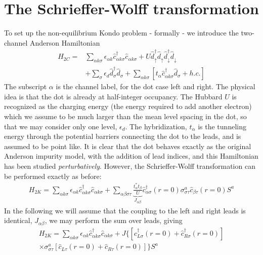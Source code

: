 \documentclass[11pt]{report}
\begin{document}
\section{The Schrieffer-Wolff transformation}
To set up the non-equilibrium Kondo problem - formally - we introduce the two-channel Anderson Hamiltonian
\begin{align}
  H_{2C}=&\sum_{\alpha k\sigma}\epsilon_{\alpha k}\hat{c}^{\dagger}_{\alpha k\sigma}\hat{c}_{\alpha
  k\sigma}+U\hat{d}^{\dagger}_{\uparrow}\hat{d}_{\uparrow}\hat{d}^{\dagger}_{\downarrow}\hat{d}_{\downarrow}\nonumber\\
  &+\sum_{\sigma}\epsilon_{d}\hat{d}^{\dagger}_{\sigma}\hat{d}_{\sigma}+\sum_{\alpha
  k\sigma}[t_{\alpha}\hat{c}^{\dagger}_{\alpha k\sigma}\hat{d}_{\sigma}+h.c.]
\end{align}
The subscript $\alpha$ is the channel label, for the dot case left and right.  The physical idea is that the dot is already at half-integer occupancy.  The Hubbard $U$ is recognized as the charging energy (the energy required to add another electron) which we assume to be much larger than the mean level spacing in the dot, so that we may consider only one level, $\epsilon_{d}$.  The hybridization, $t_{\alpha}$ is the tunneling energy through the potential barriers connecting the dot to the leads, and is assumed to be point like.  It is clear that the dot behaves exactly as the original Anderson impurity model, with the addition of lead indices, and this Hamiltonian has been studied \emph{perturbatively}.  However, the Schrieffer-Wolff transformation can be performed exactly as before:
\begin{align}
  H_{2K}=\sum_{\alpha k\sigma}\epsilon_{\alpha k}\hat{c}^{\dagger}_{\alpha k\sigma}\hat{c}_{\alpha
  k\sigma}+\sum_{\alpha\beta\sigma\tau}\underbrace{\frac{t^{*}_{\alpha}t_{\beta}}{U}}_{J_{\alpha\beta}}\hat{c}^{\dagger}_{\alpha\sigma}(r=0)\sigma^{a}_{\sigma\tau}\hat{c}_{\beta\tau}(r=0)S^{a}
\end{align}
In the following we will assume that the coupling to the left and right leads is identical, $J_{\alpha\beta}$,  we may perform the sum over leads, giving
\begin{align}\label{2lead}
  H_{2K}=\sum_{\alpha k\sigma}\epsilon_{\alpha k}\hat{c}^{\dagger}_{\alpha k\sigma}\hat{c}_{\alpha
  k\sigma}+J\{[\hat{c}_{L\sigma}^{\dagger}(r=0)+\hat{c}_{R\sigma}^{\dagger}(r=0)]\nonumber\\
  \times\sigma^{a}_{\sigma\tau}[\hat{c}_{L\tau}(r=0)+\hat{c}_{R\tau}(r=0)]\}S^{a}
\end{align}
\end{document}
